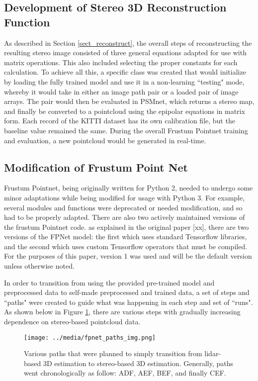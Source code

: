 \subsection{Development of Stereo 3D Reconstruction Function}
As described in Section \ref{sect_reconstruct}, the overall steps of reconstructing the resulting stereo image consisted of three general equations adapted for use with matrix operations. This also included selecting the proper constants for each calculation. To achieve all this, a specific class was created that would initialize by loading the fully trained model and use it in a non-learning ``testing" mode, whereby it would take in either an image path pair or a loaded pair of image arrays. The pair would then be evaluated in PSMnet, which returns a stereo map, and finally be converted to a pointcloud using the epipolar equations in matrix form. Each record of the KITTI dataset has its own calibration file, but the baseline value remained the same. During the overall Frustum Pointnet training and evaluation, a new pointcloud would be generated in real-time.

\subsection{Modification of Frustum Point Net}
Frustum Pointnet, being originally written for Python 2, needed to undergo some minor adaptations while being modified for usage with Python 3. For example, several modules and functions were deprecated or needed modification, and so had to be properly adapted. There are also two actively maintained versions of the frustum Pointnet code. as explained in the original paper [xx], there are two versions of the FPNet model: the first which uses standard Tensorflow libraries, and the second which uses custom Tensorflow operators that must be compiled. For the purposes of this paper, version 1 was used and will be the default version unless otherwise noted.

In order to transition from using the provided pre-trained model and preprocessed data to self-made preprocessed and trained data, a set of steps and ``paths" were created to guide what was happening in each step and set of ``runs". As shown below in Figure \ref{fp_paths}, there are various steps with gradually increasing dependence on stereo-based pointcloud data.

\begin{figure}[h]
    \texttt{[image: ../media/fpnet\_paths\_img.png]}
    \caption{Various paths that were planned to simply transition from lidar-based 3D estimation to stereo-based 3D estimation. Generally, paths went chronologically as follow: ADF, AEF, BEF, and finally CEF.}
    \label{fp_paths} 
\end{figure}

